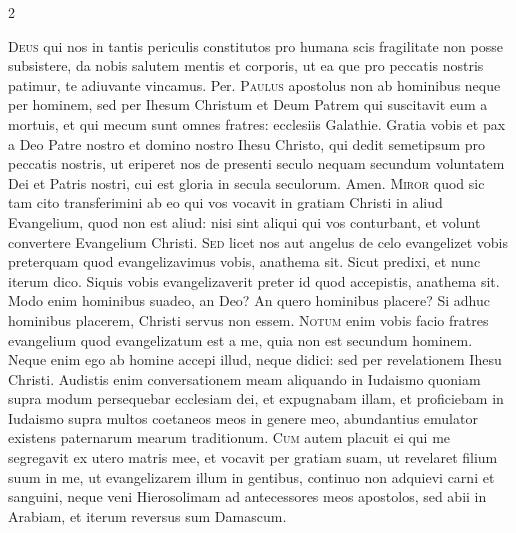 \begin{multicols*}{2}
{\color{Red} }
\par {}
\lettrine[lines=2]{\zallmancaps \color{Red} D}{eus} qui nos in tantis periculis constitutos pro humana scis fragilitate non posse subsistere, da nobis salutem mentis et corporis, ut ea que pro peccatis nostris patimur, te adiuvante vincamus. Per.
\lettrine[lines=2]{\zallmancaps \color{Blue} P}{aulus} apostolus non ab hominibus neque per hominem, sed per Ihesum Christum et Deum Patrem qui suscitavit eum a mortuis, et qui mecum sunt omnes fratres: ecclesiis Galathie. Gratia vobis et pax a Deo Patre nostro et domino nostro Ihesu Christo, qui dedit semetipsum pro peccatis nostris, ut eriperet nos de presenti seculo nequam secundum voluntatem Dei et Patris nostri, cui est gloria in secula seculorum. Amen.
\lettrine[lines=2]{\zallmancaps \color{Red} M}{iror} quod sic tam cito transferimini ab eo qui vos vocavit in gratiam Christi in aliud Evangelium, quod non est aliud: nisi sint aliqui qui vos conturbant, et volunt convertere Evangelium Christi.
\lettrine[lines=2]{\zallmancaps \color{Blue} S}{ed} licet nos aut angelus de celo evangelizet vobis preterquam quod evangelizavimus vobis, anathema sit. Sicut predixi, et nunc iterum dico. Siquis vobis evangelizaverit preter id quod accepistis, anathema sit. Modo enim hominibus suadeo, an Deo? An quero hominibus placere? Si adhuc hominibus placerem, Christi servus non essem.
\lettrine[lines=2]{\zallmancaps \color{Red} N}{otum} enim vobis facio fratres evangelium quod evangelizatum est a me, quia non est secundum hominem. Neque enim ego ab homine accepi illud, neque didici: sed per revelationem Ihesu Christi. Audistis enim conversationem meam aliquando in Iudaismo quoniam supra modum persequebar ecclesiam dei, et expugnabam illam, et proficiebam in Iudaismo supra multos coetaneos meos in genere meo, abundantius emulator existens paternarum mearum traditionum.
\lettrine[lines=2]{\zallmancaps \color{Blue} C}{um} autem placuit ei qui me segregavit ex utero matris mee, et vocavit per gratiam suam, ut revelaret filium suum in me, ut evangelizarem illum in gentibus, continuo non adquievi carni et sanguini, neque veni Hierosolimam ad antecessores meos apostolos, sed abii in Arabiam, et iterum reversus sum Damascum.

\end{multicols*}
